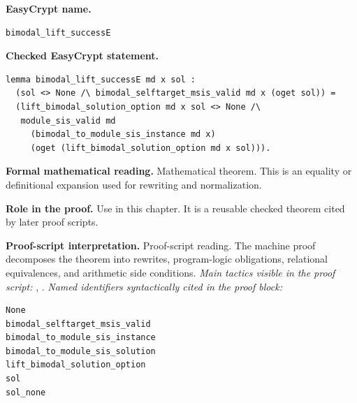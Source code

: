 \begin{formaltheorem}
\noindent\textbf{EasyCrypt name.}
\begin{lstlisting}[language=EasyCrypt,basicstyle=\ttfamily\scriptsize]
bimodal_lift_successE
\end{lstlisting}
\noindent\textbf{Checked EasyCrypt statement.}
\begin{lstlisting}[language=EasyCrypt,basicstyle=\ttfamily\scriptsize]
lemma bimodal_lift_successE md x sol :
  (sol <> None /\ bimodal_selftarget_msis_valid md x (oget sol)) =
  (lift_bimodal_solution_option md x sol <> None /\
   module_sis_valid md
     (bimodal_to_module_sis_instance md x)
     (oget (lift_bimodal_solution_option md x sol))).
\end{lstlisting}
\noindent\textbf{Formal mathematical reading.}
Mathematical theorem. This is an equality or definitional expansion used for rewriting and normalization.

\noindent\textbf{Role in the proof.}
Use in this chapter. It is a reusable checked theorem cited by later proof scripts.

\noindent\textbf{Proof-script interpretation.}
Proof-script reading. The machine proof decomposes the theorem into rewrites, program-logic obligations, relational equivalences, and arithmetic side conditions.
\emph{Main tactics visible in the proof script:} \ec{case}, \ec{rewrite}.
\emph{Named identifiers syntactically cited in the proof block:}
\begin{lstlisting}[language=EasyCrypt,basicstyle=\ttfamily\scriptsize]
None
bimodal_selftarget_msis_valid
bimodal_to_module_sis_instance
bimodal_to_module_sis_solution
lift_bimodal_solution_option
sol
sol_none
\end{lstlisting}

\end{formaltheorem}

